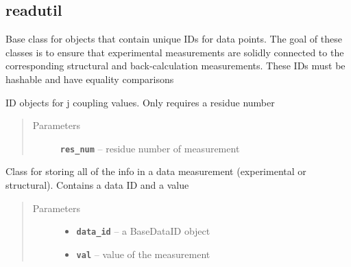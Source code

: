 \documentclass[letterpaper,10pt,english]{sphinxmanual}
\begin{document}
\subsection{readutil}
\label{modules:readutil}\label{modules:module-readutil}

\begin{fulllineitems}
\label{modules:readutil.BaseDataID}
Base class for objects that contain unique IDs for data points. The goal
of these classes is to ensure that experimental measurements are
solidly connected to the corresponding structural and back-calculation
measurements. These IDs must be hashable and have equality comparisons

\end{fulllineitems}


\begin{fulllineitems}
\label{modules:readutil.JCoupID}
ID objects for j coupling values. Only requires a residue number
\begin{quote}\begin{description}
\item[{Parameters}] \leavevmode
\textbf{\texttt{res\_num}} -- residue number of measurement

\end{description}\end{quote}

\end{fulllineitems}


\begin{fulllineitems}
\label{modules:readutil.Measurement}
Class for storing all of the info in a data measurement
(experimental or structural). Contains a data ID and a value
\begin{quote}\begin{description}
\item[{Parameters}] \leavevmode\begin{itemize}
\item {} 
\textbf{\texttt{data\_id}} -- a BaseDataID object

\item {} 
\textbf{\texttt{val}} -- value of the measurement

\end{itemize}

\end{description}\end{quote}

\end{fulllineitems}
\end{document}
